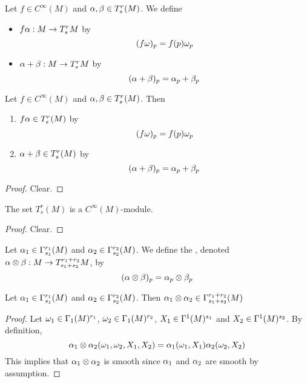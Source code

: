 \documentclass{book}
\begin{document}
	\begin{defn}
	Let $f \in C^{\infty}(M)$ and $\alpha,\beta \in T^r_s(M)$. We define 
	\begin{itemize}
	\item $f\alpha: M \rightarrow T^r_sM$ by $$(f\omega)_p = f(p)\omega_p$$
	\item $\alpha+\beta:  M \rightarrow T^r_sM$ by $$(\alpha+\beta)_p = \alpha_p+\beta_p$$
	\end{itemize}
	\end{defn}
	
	\begin{ex}
	Let $f \in C^{\infty}(M)$ and $\alpha,\beta \in T^r_s(M)$. Then
	\begin{enumerate}
	\item $f\alpha \in T^r_s(M)$ by $$(f\omega)_p = f(p)\omega_p$$
	\item $\alpha+\beta \in T^r_s(M)$ by $$(\alpha+\beta)_p = \alpha_p+\beta_p$$
	\end{enumerate}
	\end{ex}
	
	\begin{proof}
	Clear.
	\end{proof}
	
	\begin{ex}
	The set $T^r_s(M)$ is a $C^{\infty}(M)$-module.
	\end{ex}
	
	\begin{proof}
	Clear.
	\end{proof}
	
	\begin{defn}
	Let $\alpha_1 \in \Gamma^{r_1}_{s_1}(M)$ and $\alpha_2 \in \Gamma^{r_2}_{s_2}(M)$. We define the , denoted $\alpha \otimes \beta : M \rightarrow T^{r_1 + r_2}_{s_1 + s_2}M$, by $$(\alpha \otimes \beta)_p = \alpha_p \otimes \beta_p$$
	\end{defn}
	
	\begin{ex}
	Let $\alpha_1 \in \Gamma^{r_1}_{s_1}(M)$ and $\alpha_2 \in \Gamma^{r_2}_{s_2}(M)$. Then $\alpha_1 \otimes \alpha_2 \in \Gamma^{r_1 + r_2}_{s_1 + s_2}(M)$
	\end{ex}
	
	\begin{proof}
	Let $\omega_1 \in \Gamma_1(M)^{r_1}$, $\omega_2 \in \Gamma_1(M)^{r_2}$, $X_1 \in \Gamma^1(M)^{s_1}$ and $X_2 \in \Gamma^1(M)^{s_2}$. By definition,
	$$\alpha_1 \otimes \alpha_2 (\omega_1, \omega_2, X_1, X_2) = \alpha_1(\omega_1, X_1) \alpha_2(\omega_2, X_2)$$
	This implies that $\alpha_1 \otimes \alpha_2$ is smooth since $\alpha_1$ and $\alpha_2$ are smooth by assumption.
	\end{proof}
	
\end{document}
